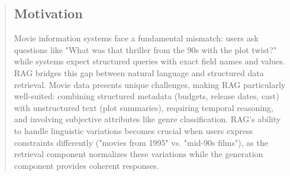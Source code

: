 \documentclass[11pt]{article}
\begin{document}
\begin{abstract}
\subsection{Motivation}
Movie information systems face a fundamental mismatch: users ask questions like "What was that thriller from the 90s with the plot twist?" while systems expect structured queries with exact field names and values. RAG bridges this gap between natural language and structured data retrieval. Movie data presents unique challenges, making RAG particularly well-suited: combining structured metadata (budgets, release dates, cast) with unstructured text (plot summaries), requiring temporal reasoning, and involving subjective attributes like genre classification. RAG's ability to handle linguistic variations becomes crucial when users express constraints differently ("movies from 1995" vs. "mid-90s films"), as the retrieval component normalizes these variations while the generation component provides coherent responses.

\begin{figure}[!ht]
\centering
{}
\end{figure}
\end{abstract}
\end{document}
